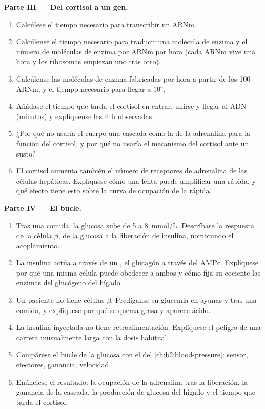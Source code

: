 \begin{problem}
\medskip
\noindent\textbf{Parte III --- Del cortisol a un gen.}
\begin{enumerate}[resume]
  \item Calcúlese el tiempo necesario para transcribir un ARNm.
  \item Calcúlense el tiempo necesario para traducir una molécula de
        enzima y el número de moléculas de enzima por ARNm por hora (cada
        ARNm vive una hora y los ribosomas empiezan uno tras otro).
  \item Calcúlense las moléculas de enzima fabricadas por hora a partir de
        los \num{100} ARNm, y el tiempo necesario para llegar a $10^{5}$.
  \item Añádase el tiempo que tarda el cortisol en entrar, unirse y
        llegar al ADN (minutos) y explíquense las \qty{4}{h} observadas.
  \item ¿Por qué no usaría el cuerpo una cascada como la de la adrenalina
        para la función del cortisol, y por qué no usaría el mecanismo del
        cortisol ante un susto?
  \item El cortisol aumenta también el número de receptores de adrenalina
        de las células hepáticas. Explíquese cómo una  lenta puede
        amplificar una rápida, y qué efecto tiene esto sobre la curva de
        ocupación de la rápida.
\end{enumerate}

\medskip
\noindent\textbf{Parte IV --- El bucle.}
\begin{enumerate}[resume]
  \item Tras una comida, la glucosa sube de 5 a \qty{8}{mmol/L}.
        Descríbase la respuesta de la célula $\beta$, de la glucosa a la
        liberación de insulina, nombrando el acoplamiento.
  \item La insulina actúa a través de un , el
        glucagón a través del AMPc. Explíquese por qué una misma célula
        puede obedecer a ambos y cómo fija su cociente las enzimas del
        glucógeno del hígado.
  \item Un paciente no tiene células $\beta$. Predíganse su glucemia en
        ayunas y tras una comida, y explíquese por qué se quema grasa y
        aparece ácido.
  \item La insulina inyectada no tiene retroalimentación. Explíquese el
        peligro de una carrera inusualmente larga con la dosis habitual.
  \item Compárese el bucle de la glucosa con el  del
        \cref{ch:b2:blood-pressure}: sensor, efectores, ganancia, velocidad.
  \item Enúnciese el resultado: la ocupación de la adrenalina tras la
        liberación, la ganancia de la cascada, la producción de glucosa del
        hígado y el tiempo que tarda el cortisol.
\end{enumerate}
\end{problem}

